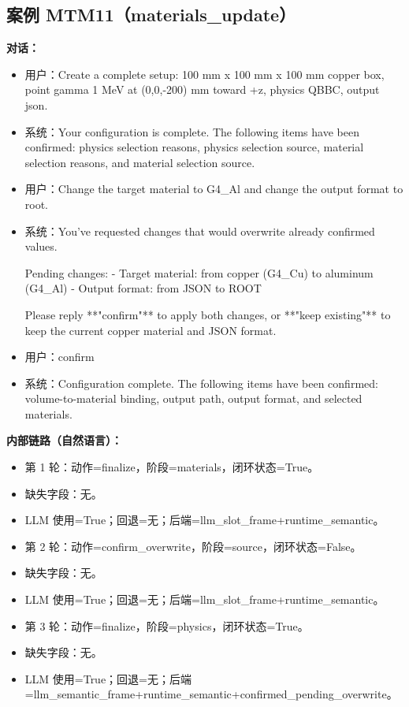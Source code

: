 \documentclass[11pt]{ctexart}
\begin{document}
\subsection{案例 MTM11（materials\_update）}
\textbf{对话：}
\begin{itemize}
\item 用户：Create a complete setup: 100 mm x 100 mm x 100 mm copper box, point gamma 1 MeV at (0,0,-200) mm toward +z, physics QBBC, output json.
\item 系统：Your configuration is complete. The following items have been confirmed: physics selection reasons, physics selection source, material selection reasons, and material selection source.
\item 用户：Change the target material to G4\_Al and change the output format to root.
\item 系统：You've requested changes that would overwrite already confirmed values.

Pending changes:
- Target material: from copper (G4\_Cu) to aluminum (G4\_Al)
- Output format: from JSON to ROOT

Please reply **"confirm"** to apply both changes, or **"keep existing"** to keep the current copper material and JSON format.
\item 用户：confirm
\item 系统：Configuration complete. The following items have been confirmed: volume-to-material binding, output path, output format, and selected materials.
\end{itemize}
\textbf{内部链路（自然语言）：}
\begin{itemize}
\item 第 1 轮：动作=finalize，阶段=materials，闭环状态=True。
\item 缺失字段：无。
\item LLM 使用=True；回退=无；后端=llm\_slot\_frame+runtime\_semantic。
\item 第 2 轮：动作=confirm\_overwrite，阶段=source，闭环状态=False。
\item 缺失字段：无。
\item LLM 使用=True；回退=无；后端=llm\_slot\_frame+runtime\_semantic。
\item 第 3 轮：动作=finalize，阶段=physics，闭环状态=True。
\item 缺失字段：无。
\item LLM 使用=True；回退=无；后端=llm\_semantic\_frame+runtime\_semantic+confirmed\_pending\_overwrite。
\end{itemize}
\end{document}
